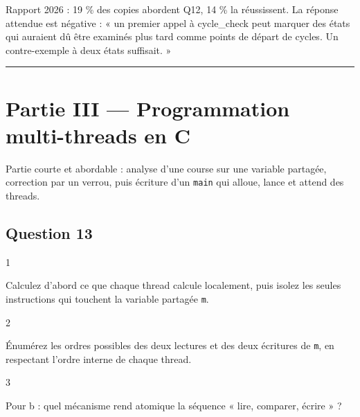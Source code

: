 \documentclass[11pt,a4paper]{article}
\begin{document}
\begin{jury}

Rapport 2026 : 19 \% des copies abordent Q12, 14 \% la réussissent. La réponse attendue est négative : « un premier appel à cycle\_check peut marquer des états qui auraient dû être examinés plus tard comme points de départ de cycles. Un contre-exemple à deux états suffisait. »

\end{jury}

\begin{center}\rule{0.5\linewidth}{0.5pt}\end{center}

\hypertarget{partie-iii-programmation-multi-threads-en-c}{%
\section{Partie III --- Programmation multi-threads en C}\label{partie-iii-programmation-multi-threads-en-c}}

Partie courte et abordable : analyse d'une course sur une variable partagée, correction par un verrou, puis écriture d'un \texttt{main} qui alloue, lance et attend des threads.

\hypertarget{question-13}{%
\subsection{Question 13}\label{question-13}}

\begin{indication}{1}

Calculez d'abord ce que chaque thread calcule localement, puis isolez les seules instructions qui touchent la variable partagée \texttt{m}.

\end{indication}

\begin{indication}{2}

Énumérez les ordres possibles des deux lectures et des deux écritures de \texttt{m}, en respectant l'ordre interne de chaque thread.

\end{indication}

\begin{indication}{3}

Pour b : quel mécanisme rend atomique la séquence « lire, comparer, écrire » ?

\end{indication}
\end{document}
